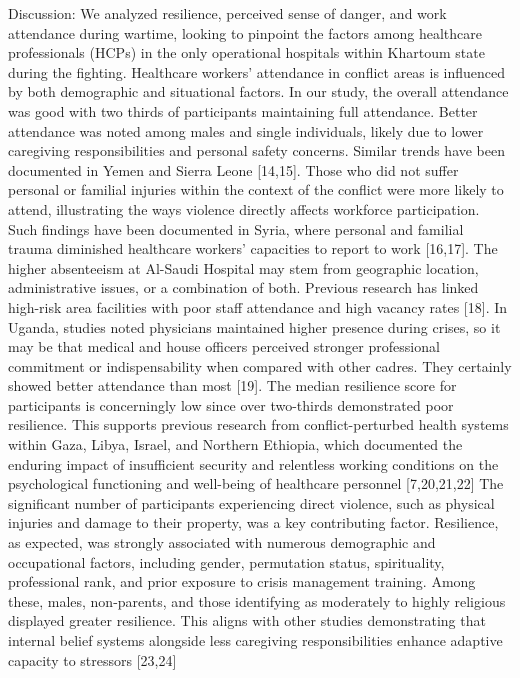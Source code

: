 Discussion:
We analyzed resilience, perceived sense of danger, and work attendance during wartime, looking to pinpoint the factors among healthcare professionals (HCPs) in the only operational hospitals within Khartoum state during the fighting.
Healthcare workers’ attendance in conflict areas is influenced by both demographic and situational factors. In our study, the overall attendance was good with two thirds of participants maintaining full attendance. Better attendance was noted among males and single individuals, likely due to lower caregiving responsibilities and personal safety concerns. Similar trends have been documented in Yemen and Sierra Leone [14,15].
Those who did not suffer personal or familial injuries within the context of the conflict were more likely to attend, illustrating the ways violence directly affects workforce participation. Such findings have been documented in Syria, where personal and familial trauma diminished healthcare workers’ capacities to report to work [16,17].
The higher absenteeism at Al-Saudi Hospital may stem from geographic location, administrative issues, or a combination of both. Previous research has linked high-risk area facilities with poor staff attendance and high vacancy rates [18].
In Uganda, studies noted physicians maintained higher presence during crises, so it may be that medical and house officers perceived stronger professional commitment or indispensability when compared with other cadres. They certainly showed better attendance than most [19].
The median resilience score for participants is concerningly low since over two-thirds demonstrated poor resilience. This supports previous research from conflict-perturbed health systems within Gaza, Libya, Israel, and Northern Ethiopia, which documented the enduring impact of insufficient security and relentless working conditions on the psychological functioning and well-being of healthcare personnel [7,20,21,22]
The significant number of participants experiencing direct violence, such as physical injuries and damage to their property, was a key contributing factor. Resilience, as expected, was strongly associated with numerous demographic and occupational factors, including gender, permutation status, spirituality, professional rank, and prior exposure to crisis management training. Among these, males, non-parents, and those identifying as moderately to highly religious displayed greater resilience. 
This aligns with other studies demonstrating that internal belief systems alongside less caregiving responsibilities enhance adaptive capacity to stressors [23,24]
